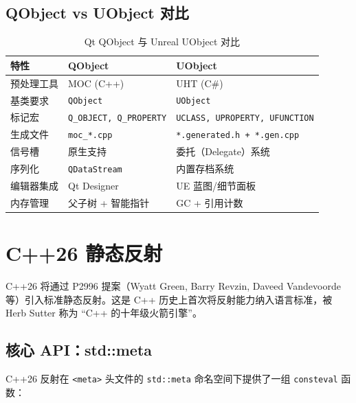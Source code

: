 \documentclass[12pt,a4paper,fontset=fandol]{ctexbook}
\begin{document}
\subsection{QObject vs UObject 对比}

\begin{table}[H]
\centering
\caption{Qt QObject 与 Unreal UObject 对比}
\begin{tabularx}{\textwidth}{lXX}
\toprule
\textbf{特性} & \textbf{QObject} & \textbf{UObject} \\
\midrule
预处理工具 & MOC (C++) & UHT (C\#) \\
基类要求 & \texttt{QObject} & \texttt{UObject} \\
标记宏 & \texttt{Q\_OBJECT, Q\_PROPERTY} & \texttt{UCLASS, UPROPERTY, UFUNCTION} \\
生成文件 & \texttt{moc\_*.cpp} & \texttt{*.generated.h + *.gen.cpp} \\
信号槽 & 原生支持 & 委托（Delegate）系统 \\
序列化 & \texttt{QDataStream} & 内置存档系统 \\
编辑器集成 & Qt Designer & UE 蓝图/细节面板 \\
内存管理 & 父子树 + 智能指针 & GC + 引用计数 \\
\bottomrule
\end{tabularx}
\end{table}

\section{C++26 静态反射}\label{sec:cpp26}

C++26 将通过 P2996 提案（Wyatt Green, Barry Revzin, Daveed Vandevoorde 等）引入标准静态反射。这是 C++ 历史上首次将反射能力纳入语言标准，被 Herb Sutter 称为 ``C++ 的十年级火箭引擎''。

\subsection{核心 API：std::meta}

C++26 反射在 \texttt{<meta>} 头文件的 \texttt{std::meta} 命名空间下提供了一组 \texttt{consteval} 函数：
\end{document}
